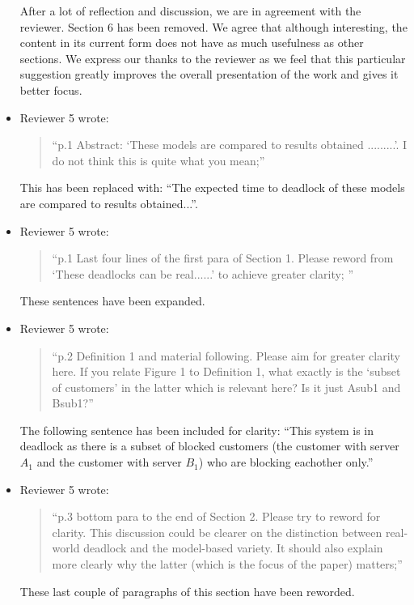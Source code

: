 \documentclass{article}
\begin{document}
\begin{itemize}
After a lot of reflection and discussion, we are in agreement with the reviewer.
Section 6 has been removed. We agree that although interesting, the content in
its current form does not have as much usefulness as other sections. We express
our thanks to the reviewer as we feel that this particular suggestion greatly
improves the overall presentation of the work and gives it better focus.


\item Reviewer 5 wrote:
\begin{quote}
``p.1 Abstract: ‘These models are compared to results obtained .........’. I do
not think this is quite what you mean;''
\end{quote}

This has been replaced with: ``The expected time to deadlock of these models are
compared to results obtained...''.


\item Reviewer 5 wrote:
\begin{quote}
``p.1 Last four lines of the first para of Section 1. Please reword from ‘These
deadlocks can be real......’ to achieve greater clarity;
''
\end{quote}

These sentences have been expanded.


\item Reviewer 5 wrote:
\begin{quote}
``p.2 Definition 1 and material following. Please aim for greater clarity here.
If you relate Figure 1 to Definition 1, what exactly is the ‘subset of
customers’ in the latter which is relevant here? Is it just Asub1 and Bsub1?''
\end{quote}

The following sentence has been included for clarity: ``This system is in
deadlock as there is a subset of blocked customers (the customer with server
$A_1$ and the customer with server $B_1$) who are blocking eachother only.''


\item Reviewer 5 wrote:
\begin{quote}
``p.3 bottom para to the end of Section 2. Please try to reword for clarity.
This discussion could be clearer on the distinction between real-world deadlock
and the model-based variety. It should also explain more clearly why the latter
(which is the focus of the paper) matters;''
\end{quote}

These last couple of paragraphs of this section have been reworded.



\end{itemize}
\end{document}
